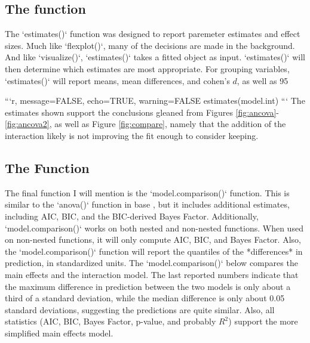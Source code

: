 {{{{{{{{{{{{{\subsection[The estimates() Function]{The  function} \label{sec:estimates}

The `estimates()` function was designed to report paremeter estimates and effect sizes. Much like `flexplot()`, many of the decisions are made in the background. And like `visualize()`, `estimates()` takes a fitted object as input. `estimates()` will then determine which estimates are most appropriate. For grouping variables, `estimates()` will report means, mean differences, and cohen's $d$, as well as 95%

```{r, message=FALSE, echo=TRUE, warning=FALSE}
estimates(model.int)
```
The estimates shown support the conclusions gleaned from Figures \ref{fig:ancova}-\ref{fig:ancova2}, as well as Figure \ref{fig:compare}, namely that the addition of the interaction likely is not improving the fit enough to consider keeping. 

\subsection[The model.comparison() Function]{The  Function} \label{sec:model.comparison}

The final function I will mention is the `model.comparison()` function. This is similar to the `anova()` function in base , but it includes additional estimates, including AIC, BIC, and the BIC-derived Bayes Factor. Additionally, `model.comparison()` works on both nested and non-nested functions. When used on non-nested functions, it will only compute AIC, BIC, and Bayes Factor. Also, the `model.comparison()` function will report the quantiles of the *differences* in prediction, in standardized units. The `model.comparison()` below compares the main effects and the interaction model. The last reported numbers indicate that the maximum difference in prediction between the two models is only about a third of a standard deviation, while the median difference is only about 0.05 standard deviations, suggesting the predictions are quite similar. Also, all statistics (AIC, BIC, Bayes Factor, p-value, and probably $R^2$) support the more simplified main effects model. 

}}}}}}}}}}}}}

